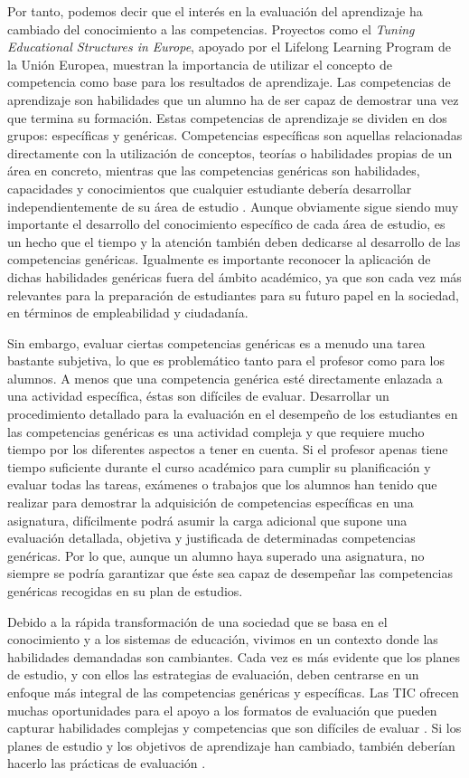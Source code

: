 Por tanto, podemos decir que el interés en la evaluación del aprendizaje ha cambiado del conocimiento a las competencias.
Proyectos como el \emph{Tuning Educational Structures in Europe}, apoyado por el Lifelong Learning Program de la Unión Europea, muestran la importancia de utilizar el concepto de competencia como base para los resultados de aprendizaje. Las competencias de aprendizaje son habilidades que un alumno ha de ser capaz de demostrar una vez que termina su formación. Estas competencias de aprendizaje se dividen en dos grupos: específicas y genéricas. Competencias específicas son aquellas relacionadas directamente con la utilización de conceptos, teorías o habilidades propias de un área en concreto, mientras que las competencias genéricas son habilidades, capacidades y conocimientos que cualquier estudiante debería desarrollar independientemente de su área de estudio \cite{gonzalez2003tuning}. Aunque obviamente sigue siendo muy importante el desarrollo del conocimiento específico de cada área de estudio, es un hecho que el tiempo y la atención también deben dedicarse al desarrollo de las competencias genéricas. Igualmente es importante reconocer la aplicación de dichas habilidades genéricas fuera del ámbito académico, ya que son cada vez más relevantes para la preparación de estudiantes para su futuro papel en la sociedad, en términos de empleabilidad y ciudadanía.

Sin embargo, evaluar ciertas competencias genéricas es a menudo una tarea bastante subjetiva, lo que es problemático tanto para el profesor como para los alumnos. A menos que una competencia genérica esté directamente enlazada a una actividad específica, éstas son difíciles de evaluar. Desarrollar un procedimiento detallado para la evaluación en el desempeño de los estudiantes en las competencias genéricas es una actividad compleja y que requiere mucho tiempo por los diferentes aspectos a tener en cuenta. Si el profesor apenas tiene tiempo suficiente durante el curso académico para cumplir su planificación y evaluar todas las tareas, exámenes o trabajos que los alumnos han tenido que realizar para demostrar la adquisición de competencias específicas en una asignatura, difícilmente podrá asumir la carga adicional que supone una evaluación detallada, objetiva y justificada de determinadas competencias genéricas. Por lo que, aunque un alumno haya superado una asignatura, no siempre se podría garantizar que éste sea capaz de desempeñar las competencias genéricas recogidas en su plan de estudios.

Debido a la rápida transformación de una sociedad que se basa en el conocimiento y a los sistemas de educación, vivimos en un contexto donde las habilidades demandadas son cambiantes. Cada vez es más evidente que los planes de estudio, y con ellos las estrategias de evaluación, deben centrarse en un enfoque más integral de las competencias genéricas y específicas. Las TIC ofrecen muchas oportunidades para el apoyo a los formatos de evaluación que pueden capturar habilidades complejas y competencias que son difíciles de evaluar \cite{Redecker:2013}. Si los planes de estudio y los objetivos de aprendizaje han cambiado, también deberían hacerlo las prácticas de evaluación \cite{Cachia:2011}.


